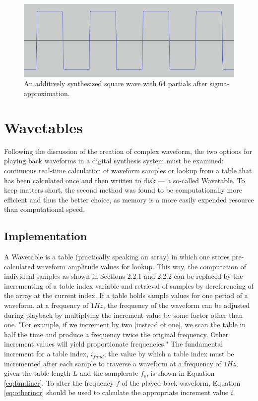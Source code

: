 \documentclass[12pt,twoside]{report}
\begin{document}
\begin{figure}
  \includegraphics[scale=0.5]{img/gibbsa}
  \caption{An additively synthesized square wave with 64 partials after sigma-approximation.}
  \label{fig:gibbsa}
\end{figure}

\pagebreak

\section{Wavetables}

Following the discussion of the creation of complex waveform, the two options for playing back waveforms in a digital synthesis system must be examined: continuous real-time calculation of waveform samples or lookup from a table that has been calculated once and then written to disk --- a so-called Wavetable. To keep matters short, the second method was found to be computationally more efficient and thus the better choice, as memory is a more easily expended resource than computational speed.

\subsection{Implementation}

A Wavetable is a table (practically speaking an array) in which one stores pre-calculated waveform amplitude values for lookup. This way, the computation of individual samples as shown in Sections 2.2.1 and 2.2.2 can be replaced by the incrementing of a table index variable and retrieval of samples by dereferencing of the array at the current index. If a table holds sample values for one period of a waveform, at a frequency of $1 Hz$, the frequency of the waveform can be adjusted during playback by multiplying the increment value by some factor other than one. "For example, if we increment by two [instead of one], we scan the table in half the time and produce a frequency twice the original frequency. Other increment values will yield proportionate frequencies."  The fundamental increment for a table index, $i_{fund}$, the value by which a table index must be incremented after each sample to traverse a waveform at a frequency of $1 Hz$, given the table length $L$ and the samplerate $f_{s}$, is shown in Equation \ref{eq:fundincr}. To alter the frequency $f$ of the played-back waveform, Equation \ref{eq:otherincr} should be used to calculate the appropriate increment value $i$.
\end{document}
